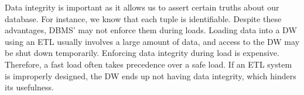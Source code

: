 Data integrity is important as it allows us to assert certain truths about our database. For instance, we know that each tuple is identifiable. Despite these advantages, DBMS' may not enforce them during loads. Loading data into a DW using an ETL usually involves a large amount of data, and access to the DW may be shut down temporarily. Enforcing data integrity during load is expensive. Therefore, a fast load often takes precedence over a safe load. If an ETL system is improperly designed, the DW ends up not having data integrity, which hinders its usefulness.

